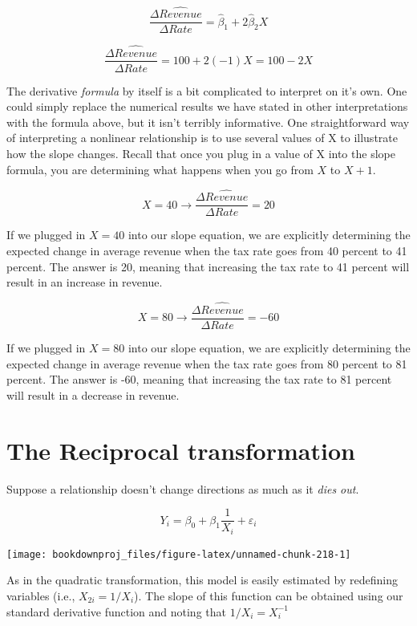 \documentclass[
]{book}
\begin{document}
\[\frac{\Delta \widehat{Revenue}}{\Delta Rate} = \hat{\beta}_1 + 2\hat{\beta}_2X\]

\[\frac{\Delta \widehat{Revenue}}{\Delta Rate} = 100 + 2(-1)X = 100 - 2X\]

The derivative \emph{formula} by itself is a bit complicated to interpret on it's own. One could simply replace the numerical results we have stated in other interpretations with the formula above, but it isn't terribly informative. One straightforward way of interpreting a nonlinear relationship is to use several values of X to illustrate how the slope changes. Recall that once you plug in a value of X into the slope formula, you are determining what happens when you go from \(X\) to \(X+1\).

\[X = 40 \rightarrow \frac{\Delta \hat{Revenue}}{\Delta Rate} = 20\]

If we plugged in \(X=40\) into our slope equation, we are explicitly determining the expected change in average revenue when the tax rate goes from 40 percent to 41 percent. The answer is 20, meaning that increasing the tax rate to 41 percent will result in an increase in revenue.

\[X = 80 \rightarrow \frac{\Delta \hat{Revenue}}{\Delta Rate} = -60\]

If we plugged in \(X=80\) into our slope equation, we are explicitly determining the expected change in average revenue when the tax rate goes from 80 percent to 81 percent. The answer is -60, meaning that increasing the tax rate to 81 percent will result in a decrease in revenue.

\section{The Reciprocal transformation}\label{the-reciprocal-transformation}

Suppose a relationship doesn't change directions as much as it \emph{dies out}.

\[Y_i = \beta_0 + \beta_1 \frac{1}{X_i} + \varepsilon_i\]

\begin{center}\texttt{[image: bookdownproj\_files/figure-latex/unnamed-chunk-218-1]} \end{center}

As in the quadratic transformation, this model is easily estimated by redefining variables (i.e., \(X_{2i}=1/X_i\)). The slope of this function can be obtained using our standard derivative function and noting that \(1/X_i = X_i^{-1}\)
\end{document}
